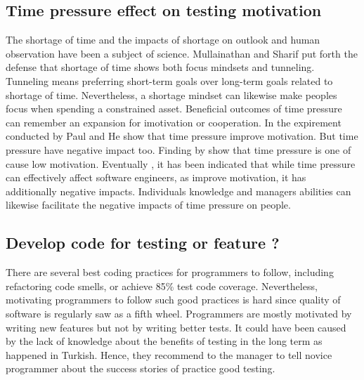\documentclass[conference, compsoc, twoside]{IEEEtran}
\begin{document}
\subsection{Time pressure effect on testing motivation}
The shortage of time and the impacts of shortage on outlook and human observation have been a subject of science\cite{mullainathan2013scarcity}.
Mullainathan and Sharif \cite{mullainathan2013scarcity} put forth the defense that shortage of time shows both focus mindsets and tunneling.
Tunneling means preferring short-term goals over long-term goals related to shortage of time.
Nevertheless, a shortage mindset can likewise make peoples focus when spending a constrained asset. 
Beneficial outcomes of time pressure can remember an expansion for imotivation or cooperation.
In the expirement conducted by Paul and He \cite{paul2012time} show that time pressure improve motivation. 
But time pressure have negative impact too.
Finding by \cite{Deak2016} show that time pressure is one of cause low motivation. 
Eventually , it has been indicated that while time pressure can effectively affect software engineers, as improve motivation, it has additionally negative impacts. 
Individuals knowledge and managers abilities can likewise facilitate the negative impacts of time pressure on people.

\subsection{Develop code for testing or feature ?}
There are several best coding practices for programmers to follow, including refactoring code smells,  or achieve 85\% test code coverage\cite{Williams2001}. 
Nevertheless, motivating programmers to follow such good practices is hard since quality of software is regularly saw as a fifth wheel. 
Programmers are mostly motivated by writing new features but not by writing better tests. 
It could have been caused by the lack of knowledge about the benefits of testing in the long term as happened in Turkish\cite{Garousi2015}. Hence, they recommend to the manager to tell novice programmer about the success stories of practice good testing.
\end{document}
